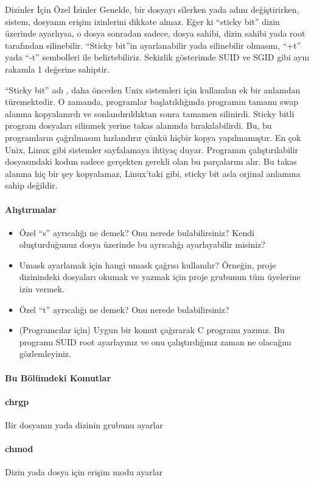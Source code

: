 \begin{section}{Dizinler İçin Özel İzinler}
Genelde, bir dosyayı silerken yada adını değiştirirken, sistem, dosyanın erişim izinlerini dikkate almaz. Eğer ki “sticky bit” dizin üzerinde ayarlıysa, o dosya sonradan sadece, dosya sahibi, dizin sahibi yada root tarafından silinebilir. “Sticky bit”in ayarlanabilir yada silinebilir olmasını, “+t” yada “-t” sembolleri ile belirtebiliriz. Sekizlik gösterimde SUID ve SGID gibi aynı rakamla 1 değerine sahiptir.

“Sticky bit” adı , daha önceden Unix sistemleri için kullanılan ek bir anlamdan türemektedir. O zamanda, programlar başlatıldığında programın tamamı swap alanına kopyalanırdı ve sonlandırıldıktan sonra tamamen silinirdi. Sticky bitli program dosyaları silinmek yerine takas alanında bırakılabilirdi. Bu, bu programların çağrılmasını hızlandırır çünkü hiçbir kopya yapılmamıştır. En çok Unix, Linux gibi sistemler sayfalamaya ihtiyaç duyar. Programın çalıştırılabilir dosyasındaki kodun sadece gerçekten gerekli olan bu parçalarını alır. Bu takas alanına hiç bir şey kopyalamaz, Linux'taki gibi, sticky bit asla orjinal anlamına sahip değildir.

\paragraph{Alıştırmalar}{
\begin{itemize}
 \item Özel “s” ayrıcalığı ne demek? Onu nerede bulabilirsiniz? Kendi oluşturduğunuz dosya üzerinde bu ayrıcalığı ayarlayabilir misiniz?
 \item Umask ayarlamak için hangi umask çağrısı kullanılır? Örneğin, proje dizinindeki dosyaları okumak ve yazmak için proje grubunun tüm üyelerine izin vermek.
 \item Özel “t” ayrıcalığı ne demek? Onu nerede bulabilirsiniz?
 \item (Programcılar için) Uygun bir komut çağırarak C programı yazınız. Bu programı SUID root ayarlayınız ve onu çalıştırdığınız zaman ne olacağını gözlemleyiniz.
 \end{itemize}}

\paragraph{Bu Bölümdeki Komutlar}{
\paragraph{chrgp}{Bir dosyanın yada dizinin grubunu ayarlar}
\paragraph{chmod}{Dizin yada dosya için erişim modu ayarlar}
}
\end{section}
